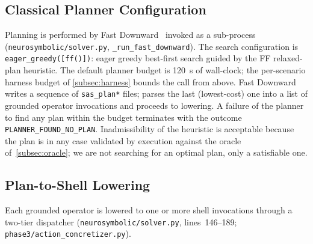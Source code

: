\subsection{Classical Planner Configuration}
\label{app:planner}

Planning is performed by Fast Downward~\cite{helmert2006fastdownward} invoked as a sub-process (\texttt{neurosymbolic/solver.py}, \texttt{\_run\_fast\_downward}). The search configuration is \texttt{eager\_greedy([ff()])}: eager greedy best-first search guided by the FF relaxed-plan heuristic. The default planner budget is 120~s of wall-clock; the per-scenario harness budget of \ref{subsec:harness} bounds the call from above. Fast Downward writes a sequence of \texttt{sas\_plan*} files; \nsplan parses the last (lowest-cost) one into a list of grounded operator invocations and proceeds to lowering. A failure of the planner to find any plan within the budget terminates with the outcome \texttt{PLANNER\_FOUND\_NO\_PLAN}. Inadmissibility of the heuristic is acceptable because the plan is in any case validated by execution against the oracle of~\ref{subsec:oracle}; we are not searching for an optimal plan, only a satisfiable one.

\subsection{Plan-to-Shell Lowering}
\label{app:lowering}

Each grounded operator is lowered to one or more shell invocations through a two-tier dispatcher (\texttt{neurosymbolic/solver.py}, lines~146--189; \texttt{phase3/action\_concretizer.py}).

